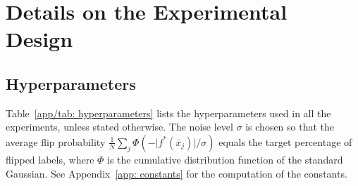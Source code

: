 
\newpage
\section{Details on the Experimental Design}\label{app: code}

\subsection{Hyperparameters}\label{app: hyper}

Table~\ref{app/tab: hyperparameters} lists the hyperparameters used in all the experiments, unless stated otherwise. The noise level $\sigma$ is chosen so that the average flip probability $\frac{1}{N}\sum_{j}\Phi\left(-\vert f^*(\bar x_j)\vert/\sigma\right)$ equals the target percentage of flipped labels, where $\Phi$ is the cumulative distribution function of the standard Gaussian. See Appendix~\ref{app: constants} for the computation of the constants.

